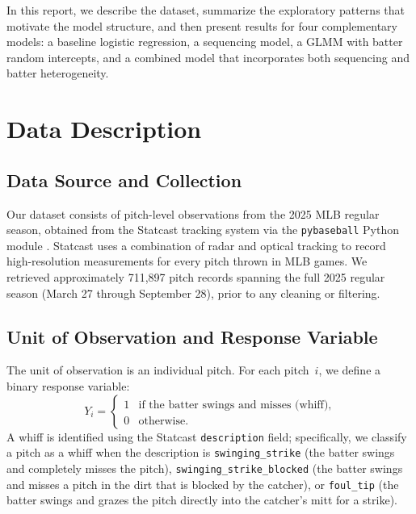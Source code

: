 \documentclass[11pt]{article}
\newcommand{\totalRaw}{711{,}897}        %
\begin{document}
In this report, we describe the dataset, summarize the exploratory patterns that motivate the model structure, and then present results for four complementary models: a baseline logistic regression, a sequencing model, a GLMM with batter random intercepts, and a combined model that incorporates both sequencing and batter heterogeneity.

\section{Data Description}

\subsection{Data Source and Collection}

Our dataset consists of pitch-level observations from the 2025 MLB regular season, obtained from the Statcast tracking system via the \texttt{pybaseball} Python module \citep{pybaseball}.
Statcast uses a combination of radar and optical tracking to record high-resolution measurements for every pitch thrown in MLB games.
We retrieved approximately \totalRaw{} pitch records spanning the full 2025 regular season (March 27 through September 28), prior to any cleaning or filtering.

\subsection{Unit of Observation and Response Variable}

The unit of observation is an individual pitch.
For each pitch~$i$, we define a binary response variable:
\[
   Y_i =
   \begin{cases}
   1 & \text{if the batter swings and misses (whiff)}, \\
   0 & \text{otherwise}.
   \end{cases}
\]
A whiff is identified using the Statcast \texttt{description} field; specifically, 
we classify a pitch as a whiff when the description is \texttt{swinging\_strike} 
(the batter swings and completely misses the pitch), \texttt{swinging\_strike\_blocked} 
(the batter swings and misses a pitch in the dirt that is blocked by the catcher), 
or \texttt{foul\_tip} (the batter swings and grazes the pitch directly into 
the catcher's mitt for a strike).
\end{document}
